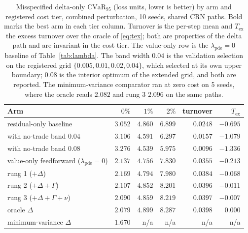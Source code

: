 \documentclass{article}
\begin{document}
\begin{table}[h]
\caption{Misspecified delta-only $\mathrm{CVaR}_{95}$ (loss units, lower is better)
by arm and registered cost tier, combined perturbation, 10 seeds, shared CRN paths.
Bold marks the best arm in each tier column. Turnover is the per-step mean and
$T_{\mathrm{ex}}$ the excess turnover over the oracle of \eqref{eq:tex}; both are
properties of the delta path and are invariant in the cost tier. The value-only row
is the $\lambda_{\mathrm{pde}} = 0$ baseline of Table~\ref{tab:lambda}. The band
width $0.04$ is the validation selection on the registered grid
$\{0.005, 0.01, 0.02, 0.04\}$, which selected at its own upper boundary; $0.08$ is
the interior optimum of the extended grid, and both are reported. The
minimum-variance comparator ran at zero cost on 5 seeds, where the oracle reads
$2.082$ and rung 3 $2.096$ on the same paths.}
\label{tab:tiers}
\centering\footnotesize\setlength{\tabcolsep}{5pt}
\begin{tabular}{@{}lrrrrr@{}}
\toprule
Arm & $0\%$ & $1\%$ & $2\%$ & turnover & $T_{\mathrm{ex}}$ \\
\midrule
residual-only baseline & $3.052$ & $4.860$ & $6.899$ & $0.0248$ & $-0.695$ \\
\quad with no-trade band $0.04$ & $3.106$ & $4.591$ & $6.297$ & $0.0157$ & $-1.079$ \\
\quad with no-trade band $0.08$ & $3.276$ & $\mathbf{4.539}$ & $\mathbf{5.975}$ & $0.0096$ & $-1.336$ \\
value-only feedforward ($\lambda_{\mathrm{pde}}{=}0$) & $2.137$ & $4.756$ & $7.830$ & $0.0355$ & $-0.213$ \\
rung 1 ($+\Delta$) & $2.169$ & $4.794$ & $7.980$ & $0.0384$ & $-0.068$ \\
rung 2 ($+\Delta{+}\Gamma$) & $2.107$ & $4.852$ & $8.201$ & $0.0396$ & $-0.011$ \\
rung 3 ($+\Delta{+}\Gamma{+}\nu$) & $2.090$ & $4.859$ & $8.219$ & $0.0397$ & $-0.007$ \\
oracle $\Delta$ & $2.079$ & $4.899$ & $8.287$ & $0.0398$ & $0.000$ \\
minimum-variance $\Delta$ & $\mathbf{1.670}$ & n/a & n/a & n/a & n/a \\
\bottomrule
\end{tabular}
\end{table}
\end{document}
